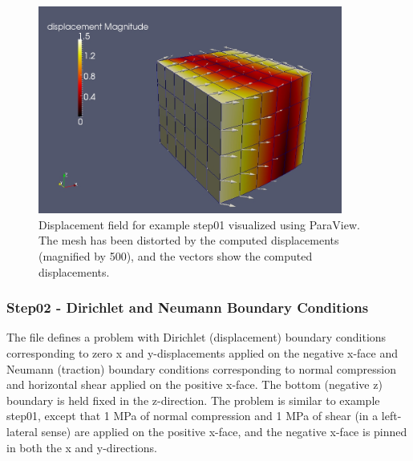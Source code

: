 \begin{figure}
  \includegraphics[width=10cm]{examples/figs/3dhex8_step01-displ}
  \caption{Displacement field for example step01 visualized using ParaView. The
    mesh has been distorted by the computed displacements (magnified by
    500), and the vectors show the computed displacements.}
  \label{fig:example:3dhex8:step01:displacement}
\end{figure}


\subsubsection{Step02 - Dirichlet and Neumann Boundary Conditions}

The  file defines a problem with Dirichlet (displacement)
boundary conditions corresponding to zero x and y-displacements applied
on the negative x-face and Neumann (traction) boundary conditions
corresponding to normal compression and horizontal shear applied on
the positive x-face. The bottom (negative z) boundary is held fixed
in the z-direction. The problem is similar to example step01, except
that 1 MPa of normal compression and 1 MPa of shear (in a left-lateral
sense) are applied on the positive x-face, and the negative x-face
is pinned in both the x and y-directions.

